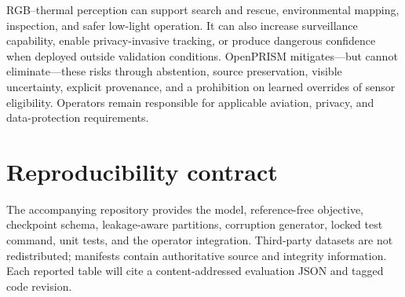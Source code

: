 \documentclass[10pt]{article}
\begin{document}
RGB--thermal perception can support search and rescue, environmental mapping,
inspection, and safer low-light operation. It can also increase surveillance
capability, enable privacy-invasive tracking, or produce dangerous confidence
when deployed outside validation conditions. OpenPRISM mitigates—but cannot
eliminate—these risks through abstention, source preservation, visible
uncertainty, explicit provenance, and a prohibition on learned overrides of
sensor eligibility. Operators remain responsible for applicable aviation,
privacy, and data-protection requirements.




\appendix
\section{Reproducibility contract}

The accompanying repository provides the model, reference-free objective,
checkpoint schema, leakage-aware partitions, corruption generator, locked
test command, unit tests, and the operator integration. Third-party datasets
are not redistributed; manifests contain authoritative source and integrity
information. Each reported table will cite a content-addressed evaluation JSON
and tagged code revision.
\end{document}
